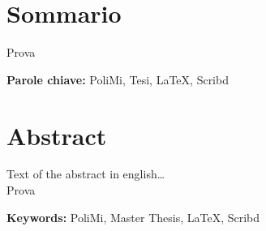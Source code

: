 % 
\cleardoublepage
%
%

\begingroup
\let\cleardoublepage\relax
\let\cleardoublepage\relax
%
\chapter*{Sommario}
%
Prova

\medskip
%
\noindent \textbf{Parole chiave:} 
PoliMi,
Tesi,
LaTeX,
Scribd
%
\clearpage
%
%
%
%
\chapter*{Abstract}
%
Text of the abstract in english\dots\\
Prova

\medskip
%
\noindent \textbf{Keywords:} 
PoliMi,
Master Thesis,
LaTeX,
Scribd


\endgroup			
%
